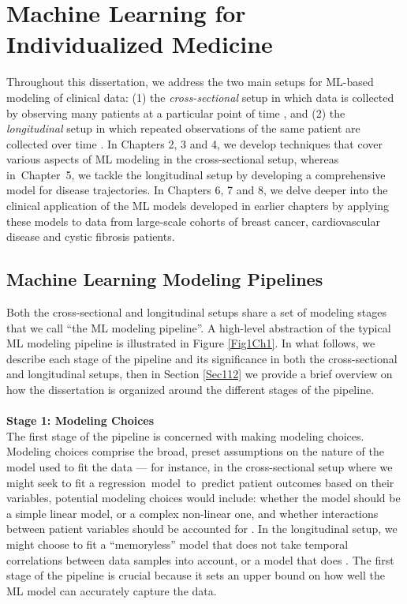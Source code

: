 \documentclass [PhD] {uclathes}
\begin{document}
\section{Machine Learning for Individualized Medicine}
\label{Sec11}
Throughout this dissertation, we address the two main setups for ML-based modeling of clinical data: (1) the \textit{cross-sectional} setup in which data is collected by observing many patients at a particular point of time \cite{levin2006study}, and (2) the \textit{longitudinal} setup in which repeated observations of the same patient are collected over time \cite{kelloway2013longitudinal}. In Chapters 2, 3 and 4, we develop techniques that cover various aspects of ML modeling in the cross-sectional setup, whereas in~Chapter~5, we tackle the longitudinal setup by developing a comprehensive model for disease trajectories. In Chapters 6, 7 and 8, we delve deeper into the clinical application of the ML models developed in earlier chapters by applying these models to data from large-scale cohorts of breast cancer, cardiovascular disease and cystic fibrosis patients.

\subsection{Machine Learning Modeling Pipelines}
Both the cross-sectional and longitudinal setups share a set of modeling stages that we call ``the ML modeling pipeline''. A high-level abstraction of the typical ML modeling pipeline is illustrated in Figure \ref{Fig1Ch1}. In what follows, we describe each stage of the pipeline and its significance in both the cross-sectional and longitudinal setups, then in Section \ref{Sec112} we provide a brief overview on how the dissertation is organized around the different stages of the pipeline.\\   
\\
\textbf{Stage 1: Modeling Choices}\\
The first stage of the pipeline is concerned with making modeling choices. Modeling choices comprise the broad, preset assumptions on the nature of the model used to fit the data --- for instance, in the cross-sectional setup where we might seek to fit a regression~model~to~predict patient outcomes based on their variables, potential modeling choices would include: whether the model should be a simple linear model, or a complex non-linear one, and whether interactions between patient variables should be accounted for \cite{barros2003alternatives}. In the longitudinal setup, we might choose to fit a ``memoryless'' model that does not take temporal correlations between data samples into account, or a model that does \cite{murtagh2011trajectories}. The first stage of the pipeline is crucial because it sets an upper bound on how well the ML model can accurately capture the data.
\end{document}
